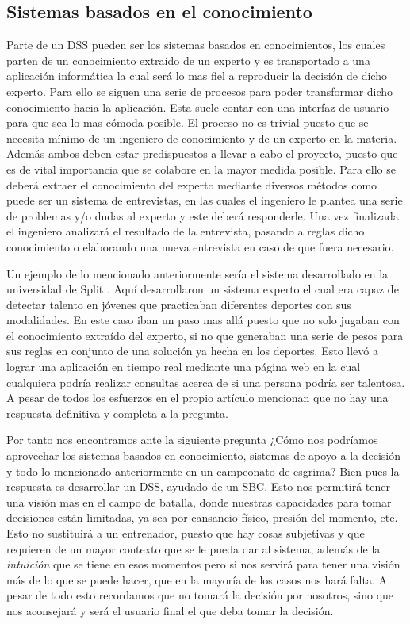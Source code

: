 \subsection{Sistemas basados en el conocimiento}

Parte de un \acs{DSS} pueden ser los sistemas basados en conocimientos, los cuales parten de un conocimiento extraído de un
 experto y es transportado a una aplicación informática la cual será lo mas fiel a reproducir
 la decisión de dicho experto. Para ello se siguen una serie de procesos para poder transformar
 dicho conocimiento hacia la aplicación. Esta suele contar con una interfaz de usuario para que
 sea lo mas cómoda posible. El proceso no es trivial puesto que se necesita mínimo
 de un ingeniero de conocimiento y de un experto en la materia. Además ambos deben estar predispuestos
 a llevar a cabo el proyecto, puesto que es de vital importancia que se colabore en la mayor
 medida posible. Para ello se deberá extraer el conocimiento del experto mediante diversos métodos
 como puede ser un sistema de entrevistas, en las cuales el ingeniero le plantea una serie
 de problemas y/o dudas al experto y este deberá responderle. Una vez finalizada el ingeniero
 analizará el resultado de la entrevista, pasando a reglas dicho conocimiento o elaborando
 una nueva entrevista en caso de que fuera necesario.

Un ejemplo de lo mencionado anteriormente sería el sistema desarrollado en la universidad de Split \cite{sportTalent}.
 Aquí desarrollaron un sistema experto el cual era capaz de detectar talento en jóvenes que
 practicaban diferentes deportes con sus modalidades. En este caso iban un paso mas allá puesto
 que no solo jugaban con el conocimiento extraído del experto, si no que generaban una serie de
 pesos para sus reglas en conjunto de una solución ya hecha en los deportes. Esto llevó a lograr
 una aplicación en tiempo real mediante una página web en la cual cualquiera podría realizar consultas
 acerca de si una persona podría ser talentosa. A pesar de todos los esfuerzos en el propio artículo
 mencionan que no hay una respuesta definitiva y completa a la pregunta.

Por tanto nos encontramos ante la siguiente pregunta ¿Cómo nos podríamos aprovechar los
 sistemas basados en conocimiento, sistemas de apoyo a la decisión y todo lo mencionado
 anteriormente en un campeonato de esgrima? Bien pues la respuesta es desarrollar un \acs{DSS}, ayudado de un \acf{SBC}. Esto nos permitirá tener una
 visión mas en el campo de batalla, donde
 nuestras capacidades para tomar decisiones están limitadas, ya sea por cansancio físico, presión del
 momento, etc. Esto no sustituirá a un entrenador, puesto que hay cosas subjetivas y que requieren
 de un mayor contexto que se le pueda dar al sistema, además de la \textit{intuición} que se tiene en esos momentos
 pero si nos servirá para tener una visión más de lo que se puede hacer, que en la mayoría de los
 casos nos hará falta. A pesar de todo esto recordamos que no tomará la decisión por nosotros,
 sino que nos aconsejará y será el usuario final el que deba tomar la decisión.

